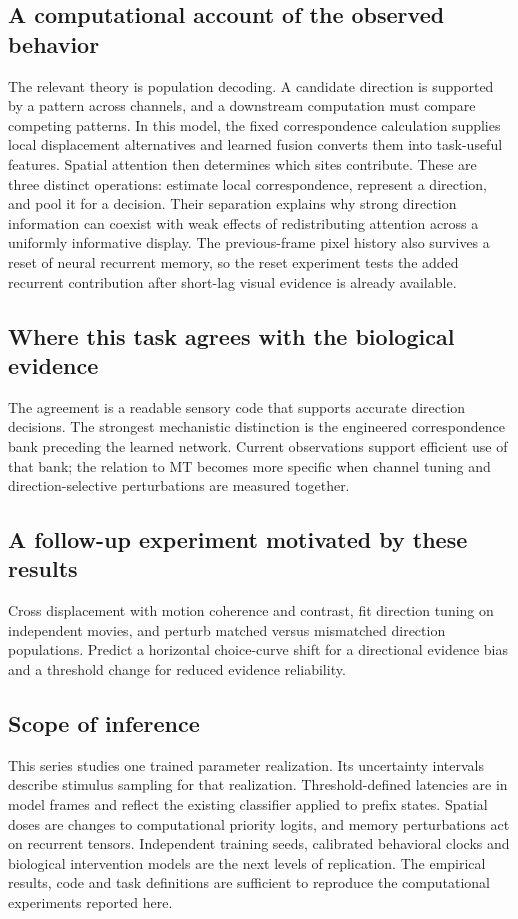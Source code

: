 \documentclass[11pt]{article}
\begin{document}
\subsection{A computational account of the observed behavior}
The relevant theory is population decoding. A candidate direction is supported by a pattern across channels, and a downstream computation must compare competing patterns. In this model, the fixed correspondence calculation supplies local displacement alternatives and learned fusion converts them into task-useful features. Spatial attention then determines which sites contribute. These are three distinct operations: estimate local correspondence, represent a direction, and pool it for a decision. Their separation explains why strong direction information can coexist with weak effects of redistributing attention across a uniformly informative display. The previous-frame pixel history also survives a reset of neural recurrent memory, so the reset experiment tests the added recurrent contribution after short-lag visual evidence is already available.

\subsection{Where this task agrees with the biological evidence}
The agreement is a readable sensory code that supports accurate direction decisions. The strongest mechanistic distinction is the engineered correspondence bank preceding the learned network. Current observations support efficient use of that bank; the relation to MT becomes more specific when channel tuning and direction-selective perturbations are measured together.

\subsection{A follow-up experiment motivated by these results}
Cross displacement with motion coherence and contrast, fit direction tuning on independent movies, and perturb matched versus mismatched direction populations. Predict a horizontal choice-curve shift for a directional evidence bias and a threshold change for reduced evidence reliability.
\subsection{Scope of inference}
This series studies one trained parameter realization. Its uncertainty intervals describe stimulus sampling for that realization. Threshold-defined latencies are in model frames and reflect the existing classifier applied to prefix states. Spatial doses are changes to computational priority logits, and memory perturbations act on recurrent tensors. Independent training seeds, calibrated behavioral clocks and biological intervention models are the next levels of replication. The empirical results, code and task definitions are sufficient to reproduce the computational experiments reported here.
\end{document}
